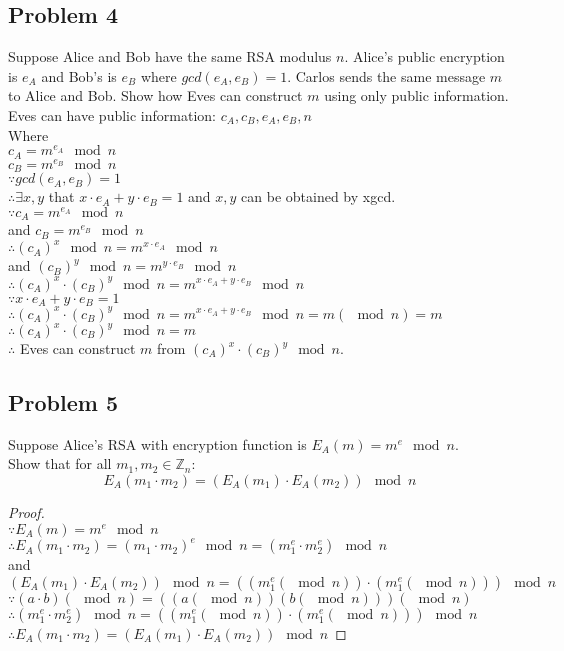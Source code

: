 \documentclass[paper=a4, fontsize=11pt]{scrartcl} %
\numberwithin{equation}{section} %
\numberwithin{figure}{section} %
\newcommand{\problem}[1]{\subsection *{Problem #1}}
\newcommand{\pnl}{$ $\newline\\}
\newcommand{\Z}{\mathbb{Z}}
\begin{document}
\problem 4 
Suppose Alice and Bob have the same RSA modulus $n$. Alice's public encryption is $e_A$ and Bob's is $e_B$ where $gcd(e_A,e_B) = 1$. Carlos sends the same message $m$ to Alice and Bob. Show how Eves can
construct $m$ using only public information.\\

Eves can have public information:
$c_A, c_B, e_A, e_B, n$\\
Where\\
$c_A = m^{e_A}\mod n$\\
$c_B = m^{e_B}\mod n$\\
$\because gcd(e_A,e_B) = 1$\\
$\therefore \exists x,y$ that $x\cdot e_A + y\cdot e_B = 1$ and $x, y$ can be obtained by xgcd.\\
$\because c_A = m^{e_A}\mod n$\\
and $c_B = m^{e_B}\mod n$\\
$\therefore (c_A)^x \mod n = m^{x\cdot e_A}\mod n$\\
and $(c_B)^y \mod n = m^{y\cdot e_B}\mod n$\\
$\therefore (c_A)^x\cdot (c_B)^y \mod n = m^{x\cdot e_A + y\cdot e_B} \mod n$\\
$\because x\cdot e_A + y\cdot e_B = 1$\\
$\therefore (c_A)^x\cdot (c_B)^y \mod n = m^{x\cdot e_A + y\cdot e_B} \mod n = m (\mod n) = m$\\
$\therefore (c_A)^x\cdot (c_B)^y \mod n = m$\\
$\therefore$ Eves can construct $m$ from $(c_A)^x\cdot (c_B)^y \mod n$.
\problem 5 
Suppose Alice's RSA with encryption function is $E_A(m) = m^e\mod n$.\\
Show that for all $m_1, m_2 \in \Z_n$:\\

$$E_A(m_1\cdot m_2) = (E_A(m_1) \cdot E_A(m_2))\mod n$$
\begin{proof}
\pnl
$\because E_A(m) = m^e\mod n$\\
$\therefore E_A(m_1\cdot m_2) = (m_1\cdot m_2)^e \mod n = (m_1^e\cdot m_2^e) \mod n $\\
and $(E_A(m_1) \cdot E_A(m_2))\mod n = ((m_1^e (\mod n)) \cdot (m_1^e (\mod n))) \mod n$\\
$\because (a\cdot b) (\mod n) = ((a (\mod n))(b (\mod n))) (\mod n)$\\
$\therefore (m_1^e\cdot m_2^e) \mod n  = ((m_1^e (\mod n)) \cdot (m_1^e (\mod n))) \mod n$\\
$\therefore E_A(m_1\cdot m_2) = (E_A(m_1) \cdot E_A(m_2))\mod n$
\end{proof}
\end{document}
